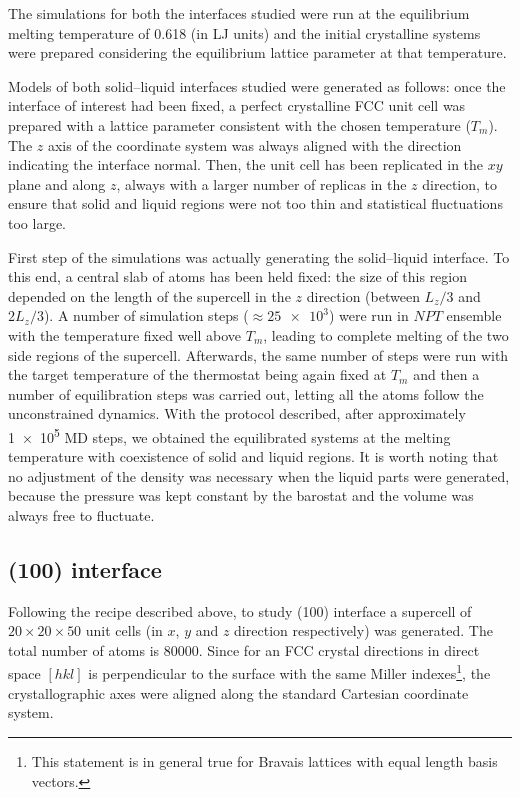 The simulations for both the interfaces studied were run at the equilibrium melting temperature of 0.618 (in LJ units) and the initial crystalline systems were prepared considering the equilibrium lattice parameter at that temperature.

Models of both solid--liquid interfaces studied were generated as follows: once the interface of interest had been fixed, a perfect crystalline FCC unit cell was prepared with a lattice parameter consistent with the chosen temperature ($T_m$). The $z$ axis of the coordinate system was always aligned with the direction indicating the interface normal. Then, the unit cell has been replicated in the $xy$ plane and along $z$, always with a larger number of replicas in the $z$ direction, to ensure that solid and liquid regions were not too thin and statistical fluctuations too large.

First step of the simulations was actually generating the solid--liquid interface. To this end, a central slab of atoms has been held fixed: the size of this region depended on the length of the supercell in the $z$ direction (between $L_z/3$ and $2L_z/3$). A number of simulation steps ($\approx \num{25e3}$) were run in $NPT$ ensemble with the temperature fixed well above $T_m$, leading to complete melting of the two side regions of the supercell. Afterwards, the same number of steps were run with the target temperature of the thermostat being again fixed at $T_m$ and then a number of equilibration steps was carried out, letting all the atoms follow the unconstrained dynamics. With the protocol described, after approximately \num{1e5} MD steps, we obtained the equilibrated systems at the melting temperature with coexistence of solid and liquid regions. It is worth noting that no adjustment of the density was necessary when the liquid parts were generated, because the pressure was kept constant by the barostat and the volume was always free to fluctuate.



\subsection{(100) interface}
Following the recipe described above, to study (100) interface a supercell of $20\times 20 \times 50$ unit cells (in $x$, $y$ and $z$ direction respectively) was generated. The total number of atoms is \num{80000}. Since for an FCC crystal directions in direct space $[hkl]$ is perpendicular to the surface with the same Miller indexes\footnote{This statement is in general true for Bravais lattices with equal length basis vectors.}, the crystallographic axes were aligned along the standard Cartesian coordinate system.

